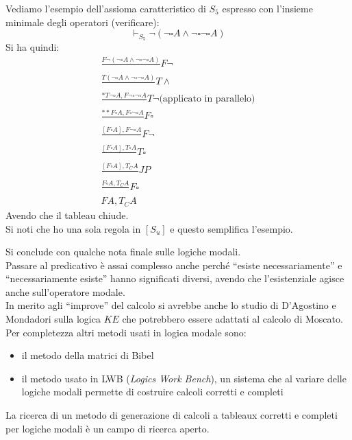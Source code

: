 \documentclass[a4paper,12pt, oneside]{book}
\begin{document}
\begin{esempio}
  Vediamo l'esempio dell'assioma caratteristico di $S_5$ espresso con l'insieme
  minimale degli operatori (\textnormal{verificare}):
  \[\vdash_{S_5}\neg(\neg\square A\land\neg\square\neg\square A)\]
  Si ha quindi:
  \begin{gather*}
    \frac{F\neg(\neg\square A\land\neg\square\neg\square A)}{}F\neg\\
    \frac{T(\neg\square A\land\neg\square\neg\square A)}{}T\land\\
    \frac{*T\neg\square A,F\neg\square\neg\square A}{}T\neg\mbox{(applicato in
    parallelo)}\\ 
    \frac{**F\square A, F\square \neg\square A}{}F\square\\
    \frac{[F\square A], F\neg \square A}{}F\neg\\
    \frac{[F\square A], T\square A}{}T\square\\
    \frac{[F\square A], T_C A}{}JP\\
    \frac{F\square A, T_C A}{}F\square\\
    FA, T_CA
  \end{gather*}
  Avendo che il tableau chiude.\\
  Si noti che ho una sola regola in $[S_u]$ e questo semplifica l'esempio.
\end{esempio}
\noindent
Si conclude con qualche nota finale sulle logiche modali.\\
Passare al predicativo è assai complesso anche perché ``esiste
necessariamente'' e ``necessariamente esiste'' hanno significati diversi,
avendo che l'esistenziale agisce anche sull'operatore modale.\\
In merito agli ``improve'' del calcolo si avrebbe anche lo studio di D'Agostino
e Mondadori sulla logica $KE$ che potrebbero essere adattati al calcolo di
Moscato.\\
Per completezza altri metodi usati in logica modale sono:
\begin{itemize}
  \item il metodo della matrici di Bibel
  \item il metodo usato in LWB (\textit{Logics Work Bench}), un sistema che al
  variare delle logiche modali permette di costruire calcoli corretti e completi
\end{itemize}
La ricerca di un metodo di generazione di calcoli a tableaux corretti e completi
per logiche modali è un campo di ricerca aperto.
\end{document}
